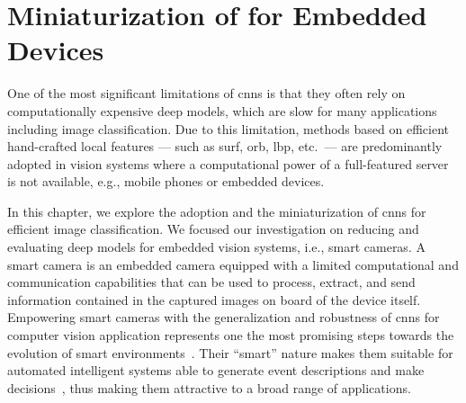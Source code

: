 \graphicspath{{img/parking/}}

\chapter{Miniaturization of  for Embedded Devices}
\label{ch:miniaturization}

One of the most significant limitations of \glspl{cnn} is that they often rely on computationally expensive deep models, which are slow for many applications including image classification.
Due to this limitation, methods based on efficient hand-crafted local features --- such as \acrshort{surf}, \acrshort{orb}, \acrshort{lbp}, etc.\ --- are predominantly adopted in vision systems where a computational power of a full-featured server is not available, e.g., mobile phones or embedded devices.

In this chapter, we explore the adoption and the miniaturization of \glspl{cnn} for efficient image classification.
We focused our investigation on reducing and evaluating deep models for embedded vision systems, i.e., smart cameras.
A smart camera is an embedded camera equipped with a limited computational and communication capabilities that can be used to process, extract, and send information contained in the captured images on board of the device itself.
Empowering smart cameras with the generalization and robustness of \glspl{cnn} for computer vision application represents one the most promising steps towards the evolution of smart environments~\cite{valera2005intelligent}.
Their ``smart'' nature makes them suitable for automated intelligent systems able to generate event descriptions and make decisions~\cite{belbachir2010smart}, thus making them attractive to a broad range of applications.

